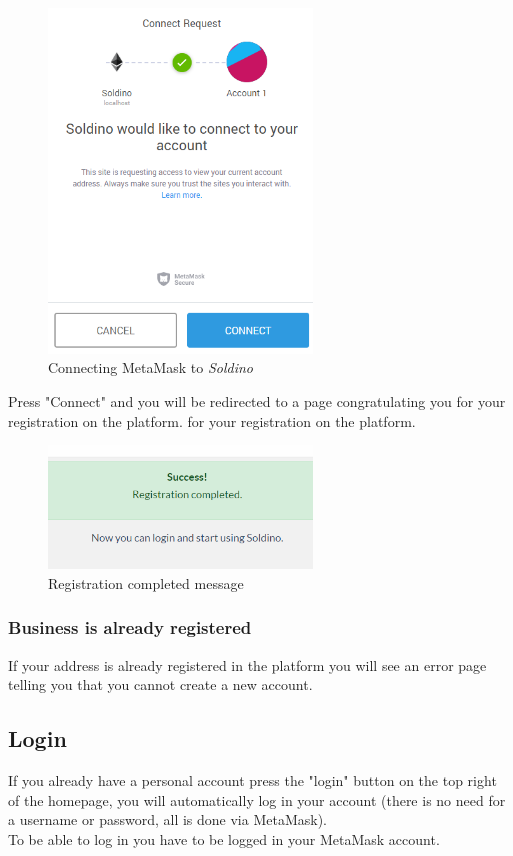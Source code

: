 	\begin{figure}[H]
		\includegraphics[width=7cm]{res/images/metamask_connect.png}
		\centering
		\caption{Connecting MetaMask to \textit{Soldino}}
	\end{figure}
	\noindent \noindent Press "Connect" and you will be redirected to a page 
	congratulating you for your registration on the platform.
	for your registration on the platform.
	\begin{figure}[H]
		\includegraphics[width=7cm]{res/images/registration_complete.png}
		\centering
		\caption{Registration completed message}
	\end{figure}
	\subsubsection{Business is already registered}
	If your address is already registered in the platform you will see an
	error page telling you that you cannot create a new account.
	\subsection{Login}
	If you already have a personal account press the "login" button on the 
	top right of the homepage, you will automatically log in your account 
	(there is no need for a username or password, all is done via MetaMask). 
	\\To be able to log in you have to be logged in your MetaMask account.
